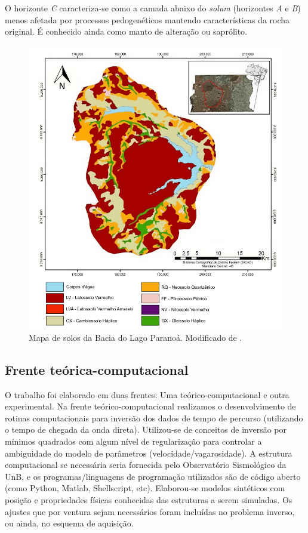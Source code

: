\documentclass[a4paper, 12 pt]{article} %
\begin{document}
O horizonte \textit{C} caracteriza-se como a camada abaixo do \textit{solum} (horizontes \textit{A} e \textit{B}) menos afetada por processos pedogenéticos mantendo características da rocha original. É
conhecido ainda como manto de alteração ou saprólito.

\begin{figure}[!hbtp]
	\begin{center}
		\includegraphics[scale=0.55]{Figuras/solo.png}
	\end{center}
	\caption{Mapa de solos da Bacia do Lago Paranoá. Modificado de \cite{menezes2010avaliaccao}.}
	\label{solo}
\end{figure} \newpage


\subsection{Frente teórica-computacional}

O trabalho foi elaborado em duas frentes: Uma teórico-computacional e outra experimental. Na frente teórico-computacional realizamos o desenvolvimento de rotinas computacionais para inversão dos dados de tempo de percurso (utilizando o tempo de chegada da onda direta). Utilizou-se de conceitos de inversão por mínimos quadrados com algum nível de regularização para controlar a ambiguidade do modelo de parâmetros (velocidade/vagarosidade). A estrutura computacional se necessária seria fornecida pelo Observatório Sismológico da UnB, e os programas/linguagens de programação utilizados são de código aberto (como Python, Matlab, Shellscript, etc). Elaborou-se modelos sintéticos com posição e propriedades físicas conhecidas das estruturas a serem simuladas. Os ajustes que por ventura sejam necessários foram incluídas no problema inverso, ou ainda, no esquema de aquisição. 
\end{document}
